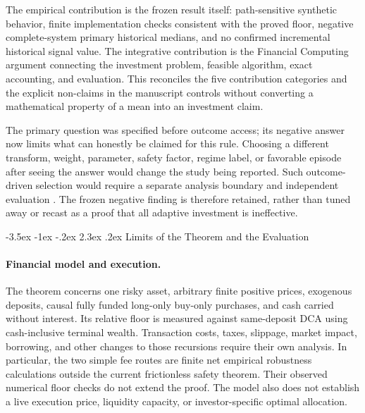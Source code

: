 \documentclass[12pt,a4paper,oneside]{report}
\makeatletter
\renewcommand\section{\@startsection{section}{1}{\z@}%
  {-3.5ex \@plus -1ex \@minus -.2ex}%
  {2.3ex \@plus .2ex}%
  {\normalfont\fontsize{14}{17}\selectfont\bfseries}}
\makeatother
\begin{document}
The empirical contribution is the frozen result itself: path-sensitive
synthetic behavior, finite implementation checks consistent with the proved
floor, negative complete-system primary historical medians, and no confirmed
incremental historical signal value. The integrative contribution is the
Financial Computing argument connecting the investment problem, feasible
algorithm, exact accounting, and evaluation. This reconciles the five
contribution categories and the explicit non-claims in the manuscript controls
without converting a mathematical property of a mean into an investment claim.

The primary question was specified before outcome access; its negative answer
now limits what can honestly be claimed for this rule. Choosing a different transform, weight,
parameter, safety factor, regime label, or favorable episode after seeing the
answer would change the study being reported. Such outcome-driven selection
would require a separate analysis boundary and independent evaluation
\citep{nosek2018preregistration,white2000datasnooping}. The frozen negative
finding is therefore retained, rather than tuned away or recast as a proof
that all adaptive investment is ineffective.

\section{Limits of the Theorem and the Evaluation}
\label{sec:discussion-limitations}

\paragraph{Financial model and execution.}
The theorem concerns one risky asset, arbitrary finite positive prices,
exogenous deposits, causal fully funded long-only buy-only purchases, and
cash carried without interest. Its relative floor is measured against
same-deposit DCA using cash-inclusive terminal wealth. Transaction costs,
taxes, slippage, market impact, borrowing, and other changes to those
recursions require their own analysis. In particular, the two simple fee
routes are finite net empirical robustness calculations outside the current
frictionless safety theorem. Their observed numerical floor checks do not
extend the proof. The model also does not establish a live execution price,
liquidity capacity, or investor-specific optimal allocation.
\end{document}
